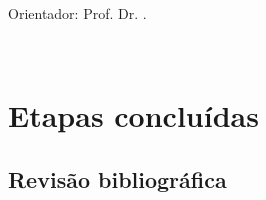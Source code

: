 \documentclass[
  12pt,
  a4paper,
  oneside,
  article,
]{abntex2}
\begin{document}
\begin{folhaderosto}
	\begin{center}
		\normalfont\normalsize
		\MakeUppercase{\imprimirautor}
	\end{center}

	\vspace*{4cm}

	\begin{center}
		\normalfont\normalsize\bfseries
		\MakeUppercase{\imprimirtitulo}
	\end{center}

	\vspace*{2.5cm}

	\hfill
	\begin{minipage}{0.5\textwidth}
		\linespread{1.5}\selectfont
		\normalfont\normalsize
		\imprimirpreambulo
		\par\vspace{0.8em}
		Orientador: Prof. Dr. \imprimirorientador.
	\end{minipage}

	\vspace*{\fill}

	\begin{center}
		\normalfont\normalsize
		\MakeUppercase{\imprimirlocal} \\
		\imprimirdata
	\end{center}
\end{folhaderosto}

\renewcommand{\contentsname}{SUMÁRIO}
\tableofcontents*
\cleardoublepage

\textual
\pagestyle{abntpaginacao}

\section{Etapas concluídas}

\subsection{Revisão bibliográfica}
\end{document}
